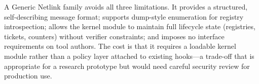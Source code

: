 A Generic Netlink family avoids all three limitations.
It provides a structured, self-describing message format; supports dump-style enumeration for registry introspection; allows the kernel module to maintain full lifecycle state (registries, tickets, counters) without verifier constraints; and imposes no interface requirements on tool authors.
The cost is that it requires a loadable kernel module rather than a policy layer attached to existing hooks---a trade-off that is appropriate for a research prototype but would need careful security review for production use.